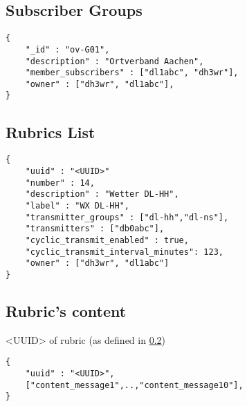 \subsection{Subscriber Groups}

\begin{lstlisting}
{
	"_id" : "ov-G01",
	"description" : "Ortverband Aachen",
	"member_subscribers" : ["dl1abc", "dh3wr"],
    "owner" : ["dh3wr", "dl1abc"],
}
\end{lstlisting}

\subsection{Rubrics List}
\label{rubric_list}

\begin{lstlisting}
{
   	"uuid" : "<UUID>"
    "number" : 14,
    "description" : "Wetter DL-HH",
    "label" : "WX DL-HH",
    "transmitter_groups" : ["dl-hh","dl-ns"],
    "transmitters" : ["db0abc"],
	"cyclic_transmit_enabled" : true,
    "cyclic_transmit_interval_minutes": 123,
 	"owner" : ["dh3wr", "dl1abc"]
}
\end{lstlisting}

\subsection{Rubric's content}
<UUID> of rubric (as defined in \ref{rubric_list})

\begin{lstlisting}
{
	"uuid" : "<UUID>",
	["content_message1",..,"content_message10"],
}
\end{lstlisting}
